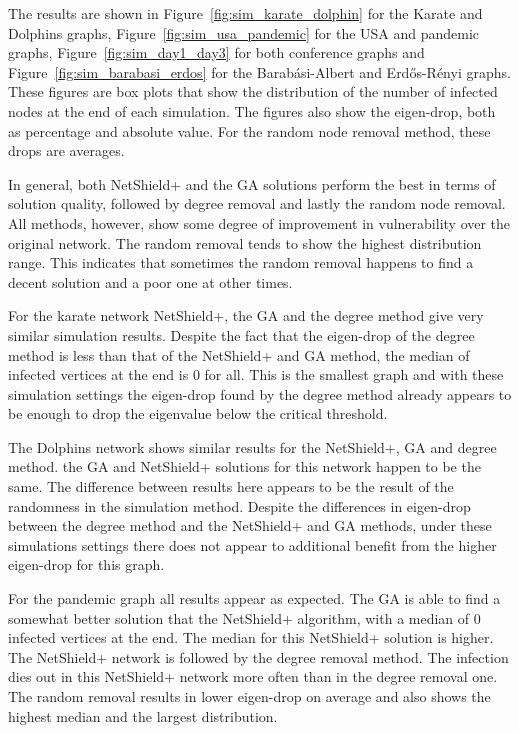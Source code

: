 \documentclass[11pt]{article}
\theoremstyle{definition}
\begin{document}
The results are shown in Figure~\ref{fig:sim_karate_dolphin} for the Karate and Dolphins graphs, Figure~\ref{fig:sim_usa_pandemic} for the USA and pandemic graphs, Figure~\ref{fig:sim_day1_day3} for both conference graphs and Figure~\ref{fig:sim_barabasi_erdos} for the Barab\'asi-Albert and Erd\H{o}s-R\'enyi graphs. These figures are box plots that show the distribution of the number of infected nodes at the end of each simulation. The figures also show the eigen-drop, both as percentage and absolute value. For the random node removal method, these drops are averages. 

In general, both NetShield+ and the GA solutions perform the best in terms of solution quality, followed by degree removal and lastly the random node removal. All methods, however, show some degree of improvement in vulnerability over the original network. The random removal tends to show the highest distribution range. This indicates that sometimes the random removal happens to find a decent solution and a poor one at other times.

For the karate network NetShield+, the GA and the degree method give very similar simulation results. Despite the fact that the eigen-drop of the degree method is less than that of the NetShield+ and GA method, the median of infected vertices at the end is 0 for all. This is the smallest graph and with these simulation settings the eigen-drop found by the degree method already appears to be enough to drop the eigenvalue below the critical threshold.

The Dolphins network shows similar results for the NetShield+, GA and degree method. the GA and NetShield+ solutions for this network happen to be the same. The difference between results here appears to be the result of the randomness in the simulation method. Despite the differences in eigen-drop between the degree method and the NetShield+ and GA methods, under these simulations settings there does not appear to additional benefit from the higher eigen-drop for this graph.

For the pandemic graph all results appear as expected. The GA is able to find a somewhat better solution that the NetShield+ algorithm, with a median of 0 infected vertices at the end. The median for this NetShield+ solution is higher. The NetShield+ network is followed by the degree removal method. The infection dies out in this NetShield+ network more often than in the degree removal one. The random removal results in lower eigen-drop on average and also shows the highest median and the largest distribution. 
\end{document}

